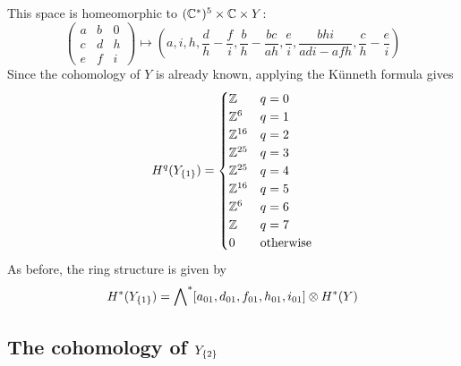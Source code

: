 This space is homeomorphic to $(\mathbb{C}^*)^5 \times \mathbb{C}\times Y$:
\[ \begin{pmatrix}
  a & b & 0 \\
  c & d & h \\
  e & f & i
\end{pmatrix} \mapsto \left(
a, i, h, \frac{d}{h}-\frac{f}{i}, \frac{b}{h}-\frac{bc}{ah},
\frac{e}{i}, \frac{bhi}{adi-afh},\frac{c}{h}-\frac{e}{i}
\right) \] 
Since the cohomology of $Y$ is already known, applying the K\"unneth
formula gives
\[ H^q(Y_{\left\{ 1 \right\}}) =
\begin{cases}
  \mathbb{Z} & q = 0 \\
  \mathbb{Z}^6 & q = 1 \\
  \mathbb{Z}^{16} & q = 2 \\
  \mathbb{Z}^{25} & q = 3 \\
  \mathbb{Z}^{25} & q = 4 \\
  \mathbb{Z}^{16} & q = 5 \\
  \mathbb{Z}^6 & q = 6 \\
  \mathbb{Z} & q = 7 \\
  0 & \text{otherwise}
\end{cases} \] 
As before, the ring structure is given by
\[ H^*(Y_{\left\{ 1 \right\}}) =
\bigwedge\nolimits^*[a_{01},d_{01},f_{01},h_{01},i_{01}] \otimes H^*(Y)\]

\subsection{The cohomology of $Y_{\left\{ 2 \right\}}$}

